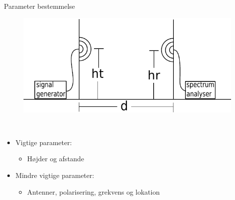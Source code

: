 \begin{frame}{Parameter bestemmelse}
\begin{figure}[!htbp]
	\centering
	\includegraphics[width = 0.8\columnwidth]{figures/setup.pdf}
\end{figure}
\begin{minipage}{0.15\textwidth}
 \textcolor{white}{.}  
\end{minipage}%
\begin{minipage}{0.8\textwidth}
\begin{itemize}
\item Vigtige parameter:
\begin{itemize}
\item Højder og afstande
\end{itemize}
\item Mindre vigtige parameter:
\begin{itemize}
\item Antenner, polarisering, grekvens og lokation
\end{itemize}
\end{itemize}
\end{minipage}
\end{frame}

